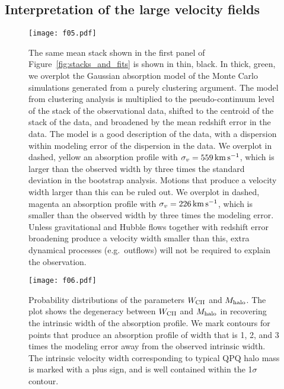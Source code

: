 \documentclass[iop]{emulateapj}
\begin{document}
\subsection{Interpretation of the large velocity fields}
\label{sec:significance_width}

\begin{figure}
\texttt{[image: f05.pdf]}
\caption{The same  mean stack shown in the first panel of 
Figure~\ref{fig:stacks_and_fits} is shown in thin, black. In thick, green, we overplot the 
Gaussian absorption model of the Monte Carlo simulations generated from a purely clustering 
argument. The model from clustering analysis is multiplied to the pseudo-continuum level of the 
stack of the observational data, shifted to the centroid of the stack of the data, and broadened 
by the mean redshift error in the data. The model is a good description of the data, with a 
dispersion within modeling error of the dispersion in the data. We overplot in dashed, yellow an 
absorption profile with $\sigma_v=559\,{\rm km\,s^{-1}}$, which is larger than the observed width 
by three times the standard deviation in the bootstrap analysis. Motions that produce a velocity 
width larger than this can be ruled out. We overplot in dashed, magenta an absorption profile with 
$\sigma_v=226\,{\rm km\,s^{-1}}$, which is smaller than the observed width by three times the
modeling error. Unless gravitational and Hubble flows together with redshift error broadening 
produce a velocity width smaller than this, extra dynamical processes (e.g.\ outflows) will not be 
required to explain the observation. 
}
\label{fig:monte}
\end{figure}

\begin{figure}
\texttt{[image: f06.pdf]}
\caption{
Probability distributions of the parameters $W_{\rm CII}$ and $M_{\rm halo}$. The plot shows the 
degeneracy between $W_{\rm CII}$ and $M_{\rm halo}$ in recovering the intrinsic width of the 
absorption profile. We mark contours for points that produce an absorption 
profile of width that is 1, 2, and 3 times the modeling error away from the observed intrinsic 
width. The intrinsic velocity width corresponding to typical QPQ halo mass is marked with a plus 
sign, and is well contained within the 1$\sigma$ contour.}
\label{fig:contour}
\end{figure}
\end{document}
